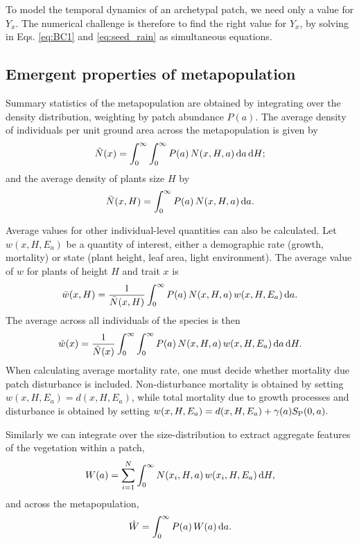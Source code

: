 \documentclass[10pt,twoside]{article}
\begin{document}
To model the temporal dynamics of an archetypal patch, we need only a
value for \(Y_x\). The numerical challenge is therefore to find the
right value for \(Y_x\), by solving in Eqs. \ref{eq:BC1} and
\ref{eq:seed_rain} as simultaneous equations.

\subsection{Emergent properties of
metapopulation}\label{emergent-properties-of-metapopulation}

Summary statistics of the metapopulation are obtained by integrating
over the density distribution, weighting by patch abundance \(P(a)\).
The average density of individuals per unit ground area across the metapopulation is given by
\begin{equation}
  \hat{N}(x) = \int_{0}^{\infty} \int_{0}^{\infty}P(a) \, N(x, H, a) \, {\rm d}a \, {\rm d}H;
\end{equation}
and the average density of plants size \(H\) by
\begin{equation}
  \bar{N}(x, H) = \int_{0}^{\infty}P(a) \, N(x, H, a) \, {\rm d}a.
\end{equation}

Average values for other individual-level quantities can also be calculated.
Let
\(w(x, H, E_a)\) be a quantity of interest, either a demographic rate
(growth, mortality) or state (plant height, leaf area, light environment).
The average value of \(w\) for plants of height $H$ and trait $x$ is
\begin{equation}\bar{w}(x, H) = \frac1{\bar{N}(x, H)}\int_{0}^{\infty}P(a) \, N(x, H, a) \, w(x, H, E_a) \, {\rm d}a.
\end{equation}
The average across all individuals of the species is then
\begin{equation}
  \hat{w}(x) = \frac1{\hat{N}(x) }\int_{0}^{\infty} \int_{0}^{\infty}P(a) \, N(x, H, a) \, w(x, H, E_a) \, {\rm d}a \, {\rm d}H.
\end{equation}
When calculating average mortality rate, one must decide whether
mortality due patch disturbance is included. Non-disturbance mortality
is obtained by setting \(w(x, H, E_a) = d(x, H, E_a)\), while total
mortality due to growth processes and disturbance is obtained by setting
\(w(x, H, E_a) = d(x, H, E_a) + \gamma(a) S_{\rm P}(0, a).\)

Similarly we can integrate over the size-distribution to extract aggregate
features of the vegetation within a patch,
\begin{equation}
  W(a) = \sum_{i = 1}^{N} \int_{0}^{\infty} N(x_i, H, a) \, w(x_i, H, E_a) \, {\rm d}H,
\end{equation}
and across the metapopulation,
\begin{equation}
  \hat{W} = \int_{0}^{\infty} P(a) \, W(a) \, {\rm d}a.
\end{equation}
\end{document}
